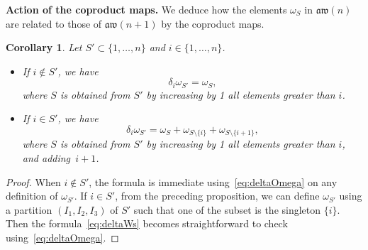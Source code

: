 \documentclass[10pt,a4paper]{amsart}
\numberwithin{equation}{section}
\newtheorem{coro}[theo]{Corollary}
\theoremstyle{definition}
\begin{document}
{\bf Action of the coproduct maps.} We deduce how the elements $\omega_S$ in $\mathfrak{aw}(n)$ are related to those of $\mathfrak{aw}(n+1)$ by the coproduct maps.
\begin{coro}\label{coro:deltaW}
Let $S'\subset\{1,\dots,n\}$ and $i\in\{1,\dots,n\}$.
\begin{itemize}\itemsep=0pt
\item If $i\notin S'$, we have
\begin{equation*}
\delta_i\omega_{S'}= \omega_{S} ,
\end{equation*}
where $S$ is obtained from $S'$ by increasing by 1 all elements greater than $i$.
\item If $i\in S'$, we have
\begin{equation}\label{eq:deltaWs}
\delta_i\omega_{S'}= \omega_{S} +\omega_{S\setminus\{i\}}+\omega_{S\setminus\{i+1\}},
\end{equation}
where $S$ is obtained from $S'$ by increasing by 1 all elements greater than $i$, and adding~${i+1}$.
\end{itemize}
\end{coro}
\begin{proof}
When $i\notin S'$, the formula is immediate using~\eqref{eq:deltaOmega} on any definition of $\omega_{S'}$. If $i\in S'$, from the preceding proposition, we can define $\omega_{S'}$ using a partition $(I_1,I_2,I_3)$ of $S'$ such that one of the subset is the singleton $\{i\}$. Then the formula~\eqref{eq:deltaWs} becomes straightforward to check using~\eqref{eq:deltaOmega}.
\end{proof}
\end{document}
